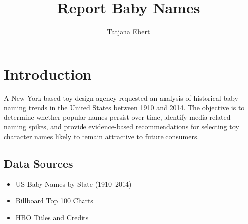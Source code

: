 \documentclass[11pt,preprint]{elsarticle}
\numberwithin{equation}{section}
\numberwithin{figure}{section}
\numberwithin{table}{section}
\def\tightlist{} %
\begin{document}
\begin{frontmatter}  %

\title{Report Baby Names}





\author[Add1]{Tatjana Ebert}
\ead{}








\vspace{1cm}





\vspace{0.5cm}

\end{frontmatter}

\setcounter{footnote}{0}



\pagestyle{fancy}
\chead{}
\rhead{}
\lfoot{}
\lhead{}
\cfoot{}


\headsep 35pt %




\section{Introduction}\label{introduction}

A New York based toy design agency requested an analysis of historical
baby naming trends in the United States between 1910 and 2014. The
objective is to determine whether popular names persist over time,
identify media-related naming spikes, and provide evidence-based
recommendations for selecting toy character names likely to remain
attractive to future consumers.

\subsection{Data Sources}\label{data-sources}

\begin{itemize}
\tightlist
\item
  US Baby Names by State (1910--2014)
\item
  Billboard Top 100 Charts
\item
  HBO Titles and Credits
\end{itemize}
\end{document}
